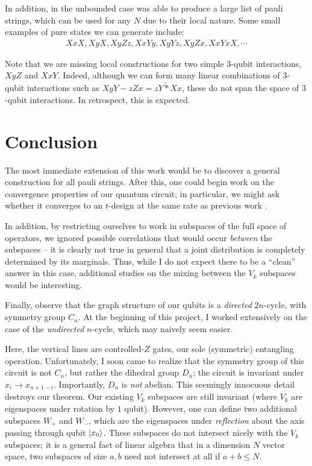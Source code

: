 \documentclass[fleqn,12pt]{article}
\newcommand{\ts}{\tilde{*}}
\begin{document}
In addition, in the unbounded case was able to produce
a large list of pauli strings, which can be used for any $N$ due
to their local nature. Some small examples of pure states we can generate include:
\begin{align*}
    XxX, XyX, XyZz, XxYy, XyYz,XyZx, XxYxX,\cdots
\end{align*}

Note that we are missing local constructions for two simple $3$-qubit
interactions, $XyZ$ and $XxY$. Indeed, although we can
form many linear combinations of $3$-qubit interactions
such as $XyY -zZx  = zY  \ts  Xx$, these do not span
the space of $3$-qubit interactions.
In retrospect, this is expected.

\section{Conclusion}

The most immediate extension of this work would be to
discover a general construction for all pauli strings.
After this, one could begin work on the convergence
properties of our quantum circuit; in particular, we might
ask whether it converges to an $t$-design at the same rate
as previous work \cite{Brand_o_2016}\cite{Haferkamp_2022}.

In addition, by restricting ourselves to work in
subspaces of the full space of operators, we ignored possible
correlations that would occur \emph{between} the subspaces --
it is clearly not true in general that a joint distribution
is completely determined by its marginals. Thus, while I do not
expect there to be a ``clean'' answer in this case, additional
studies on the mixing between the $V_k$ subspaces would be interesting.

Finally, observe that the graph structure of our qubits is a \emph{directed}
$2n$-cycle, with symmetry group $C_n$. At the beginning of this project,
I worked extensively on the
case of the \emph{undirected} $n$-cycle, which may naively seem easier.


Here, the vertical lines are controlled-$Z$ gates, our sole (symmetric)
entangling operation. Unfortunately, I soon came to realize that the
symmetry group of this circuit is not $C_n$, but rather the dihedral group
$D_n$; the circuit is invariant under $x_{i}\to x_{n+1-i}$. Importantly,
$D_n$ is \emph{not} abelian. This seemingly innocuous detail destroys
our theorem. Our existing $V_k$ subspaces are still
invariant (where $V_k$ are eigenspaces under rotation by $1$ qubit).
However, one can define two additional subspaces $W_+$ and $W_-$, which
are the eigenspaces under \emph{reflection} about the axis
passing through qubit $\ket{x_0}$. These subspaces do not intersect
nicely with the $V_k$ subspaces; it is a general fact of linear algebra
that in a dimension $N$ vector space, two subspaces of size $a,b$ need
not intersect at all if $a + b \leq N$.
\end{document}
